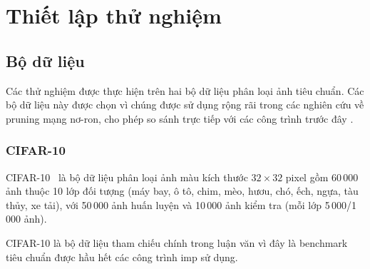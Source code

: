\chapter{Thiết lập thử nghiệm}
    \section{Bộ dữ liệu}
        Các thử nghiệm được thực hiện trên hai bộ dữ liệu phân loại ảnh tiêu chuẩn.
        Các bộ dữ liệu này được chọn vì chúng được sử dụng rộng rãi trong các
        nghiên cứu về pruning mạng nơ-ron, cho phép so sánh trực tiếp với
        các công trình trước đây \cite{imp, grasp, synflow, hybrid}.
         
         
         
         
        \subsection{CIFAR-10}
        \label{subsec:cifar10}
         
        CIFAR-10~\cite{krizhevsky2009learning} là bộ dữ liệu phân loại ảnh màu
        kích thước $32 \times 32$ pixel gồm 60\,000 ảnh thuộc 10 lớp đối tượng
        (máy bay, ô tô, chim, mèo, hươu, chó, ếch, ngựa, tàu thủy, xe tải),
        với 50\,000 ảnh huấn luyện và 10\,000 ảnh kiểm tra (mỗi lớp 5\,000/1\,000 ảnh).
         
        CIFAR-10 là bộ dữ liệu tham chiếu chính trong luận văn vì đây là benchmark
        tiêu chuẩn được hầu hết các công trình \gls{imp} sử dụng.
        
